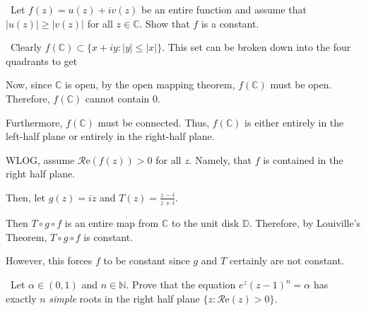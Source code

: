 \documentclass[12pt]{Homework}
\newcommand{\re}{\mathscr{R}\text{e}}
\begin{document}
\begin{problem} $\,$
Let $f(z)=u(z)+iv(z)$ be an entire function and assume that $|u(z)|\ge|v(z)|$ for all $z\in\mathbb{C}.$ Show that $f$ is a constant.
\end{problem}


\begin{solution}$\,$
Clearly $f(\mathbb{C})\subset\{x+iy:|y|\le|x|\}.$ This set can be broken down into the four quadrants to get 

\begin{center}
\end{center}

Now, since $\mathbb{C}$ is open, by the open mapping theorem, $f(\mathbb{C})$ must be open. Therefore, $f(\mathbb{C})$ cannot contain $0$. 

Furthermore, $f(\mathbb{C})$ must be connected. Thus, $f(\mathbb{C})$ is either entirely in the left-half plane or entirely in the right-half plane.

WLOG, assume $\re(f(z))>0$ for all $z.$ Namely, that $f$ is contained in the right half plane.

Then, let $g(z)=iz$ and $T(z)=\frac{z-i}{z+i}$.

Then $T\circ g\circ f$ is an entire map from $\mathbb{C}$ to the unit disk $\mathbb{D}$. Therefore, by Louiville's Theorem, $T\circ g\circ f$ is constant. 

However, this forces $f$ to be constant since $g$ and $T$ certainly are not constant.
\end{solution}
\newpage



\begin{problem} $\,$
Let $\alpha\in(0,1)$ and $n\in\mathbb{N}$. Prove that the equation $e^z(z-1)^n=\alpha$ has exactly $n$ \textit{simple} roots in the right half plane $\{z:\re(z)>0\}.$
\end{problem}
\end{document}
